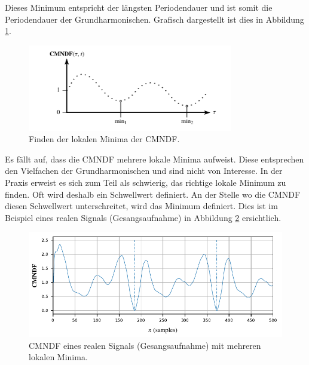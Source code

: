 Dieses Minimum entspricht der längsten Periodendauer und ist somit die Periodendauer der Grundharmonischen.
Grafisch dargestellt ist dies in Abbildung \ref{autotune:fig:cmndfMinimum}.
\begin{figure}
	\centering
	\includegraphics[width=0.8\textwidth]{papers/autotune/images/CMNDF_Minimum.pdf}
	\caption{Finden der lokalen Minima der CMNDF.}
    \label{autotune:fig:cmndfMinimum}
\end{figure}

Es fällt auf, dass die CMNDF mehrere lokale Minima aufweist.
Diese entsprechen den Vielfachen der Grundharmonischen und sind nicht von Interesse.
In der Praxis erweist es sich zum Teil als schwierig, das richtige lokale Minimum zu finden.
Oft wird deshalb ein Schwellwert definiert.
An der Stelle wo die CMNDF diesen Schwellwert unterschreitet, wird das Minimum definiert.
Dies ist im Beispiel eines realen Signals (Gesangsaufnahme) in Abbildung \ref{autotune:fig:cmndfRealSignal} ersichtlich.
\begin{figure}
	\centering
	\includegraphics[width=\textwidth]{papers/autotune/images/Example-CMNDF.pdf}
	\caption{CMNDF eines realen Signals (Gesangsaufnahme) mit mehreren lokalen Minima.}
    \label{autotune:fig:cmndfRealSignal}
\end{figure}

